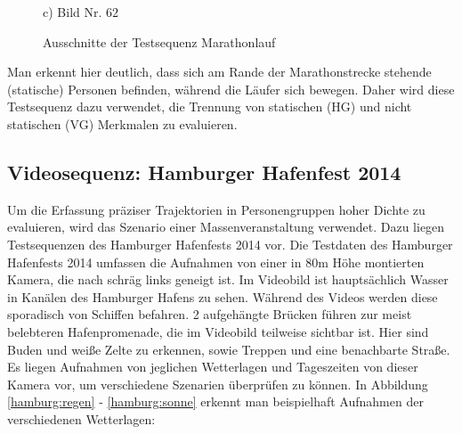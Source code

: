 \begin{figure}[H]
\begin{minipage}{0.3\textwidth}
    c) Bild Nr. $62$
  \end{minipage}
\caption{Ausschnitte der Testsequenz Marathonlauf \cite{AliS07}}
\label{run}
\end{figure}

Man erkennt hier deutlich, dass sich am Rande der Marathonstrecke stehende (statische) Personen befinden, während die Läufer sich bewegen. Daher wird diese Testsequenz dazu verwendet, die Trennung von statischen (HG) und nicht statischen (VG) Merkmalen zu evaluieren.

\subsection{Videosequenz: Hamburger Hafenfest 2014}
Um die Erfassung präziser Trajektorien in Personengruppen hoher Dichte zu evaluieren, wird das Szenario einer Massenveranstaltung verwendet. Dazu liegen Testsequenzen des Hamburger Hafenfests 2014 vor. Die Testdaten des Hamburger Hafenfests 2014 umfassen die Aufnahmen von einer in 80m Höhe montierten Kamera, die nach schräg links geneigt ist. Im Videobild ist hauptsächlich Wasser in Kanälen des Hamburger Hafens zu sehen. Während des Videos werden diese sporadisch von Schiffen befahren. 2 aufgehängte Brücken führen zur meist belebteren Hafenpromenade, die im Videobild teilweise sichtbar ist. Hier sind Buden und weiße Zelte zu erkennen, sowie Treppen und eine benachbarte Straße. Es liegen Aufnahmen von jeglichen Wetterlagen und Tageszeiten von dieser Kamera vor, um verschiedene Szenarien überprüfen zu können. In Abbildung \ref{hamburg:regen} - \ref{hamburg:sonne} erkennt man beispielhaft Aufnahmen der verschiedenen Wetterlagen:

